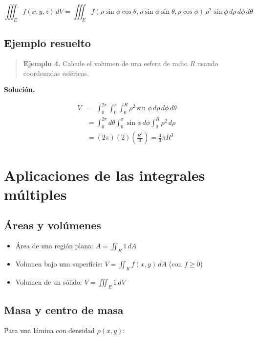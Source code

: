 \documentclass[
]{book}
\providecommand{\tightlist}{%
  \setlength{\itemsep}{0pt}\setlength{\parskip}{0pt}}
\begin{document}
\[
\iiint_E f(x, y, z) \, dV = \iiint_E f(\rho\sin\phi\cos\theta, \rho\sin\phi\sin\theta, \rho\cos\phi) \, \rho^2 \sin\phi \, d\rho \, d\phi \, d\theta
\]

\subsection{Ejemplo resuelto}\label{ejemplo-resuelto-25}

\begin{quote}
\textbf{Ejemplo 4.} Calcule el volumen de una esfera de radio \(R\) usando coordenadas esféricas.
\end{quote}

\textbf{Solución.}

\[
\begin{aligned}
V &= \int_0^{2\pi} \int_0^{\pi} \int_0^R \rho^2 \sin\phi \, d\rho \, d\phi \, d\theta \\
&= \int_0^{2\pi} d\theta \int_0^{\pi} \sin\phi \, d\phi \int_0^R \rho^2 \, d\rho \\
&= (2\pi)(2)\left(\frac{R^3}{3}\right) = \frac{4}{3}\pi R^3
\end{aligned}
\]

\section{Aplicaciones de las integrales múltiples}\label{aplicaciones-de-las-integrales-muxfaltiples}

\subsection{Áreas y volúmenes}\label{uxe1reas-y-voluxfamenes}

\begin{itemize}
\tightlist
\item
  Área de una región plana: \(A = \iint_R 1 \, dA\)
\item
  Volumen bajo una superficie: \(V = \iint_R f(x, y) \, dA\) (con \(f \geq 0\))
\item
  Volumen de un sólido: \(V = \iiint_E 1 \, dV\)
\end{itemize}

\subsection{Masa y centro de masa}\label{masa-y-centro-de-masa}

Para una lámina con densidad \(\rho(x, y)\):
\end{document}
